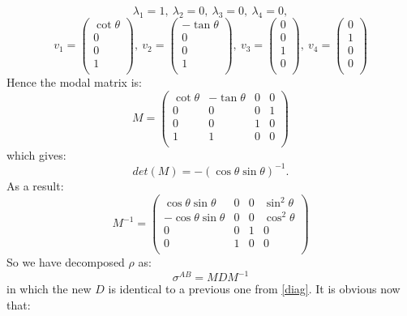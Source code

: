 \begin{itemize}
\begin{equation}
\lambda_1=1,\:  \lambda_2=0,\:  \lambda_3=0,\:  \lambda_4=0, 
\end{equation}
\begin{equation}
v_1=\left(
\begin{array}{c}
 \cot \theta \\
 0\\
 0\\
 1 \\
\end{array}
\right),
\:  v_2=\left(
\begin{array}{c}
 -\tan \theta \\
 0\\
 0\\
 1 \\
\end{array}
\right),
\:  v_3= \left(
\begin{array}{c}
 0 \\
 0\\
 1\\
 0 \\
\end{array}
\right),\:  v_4= 
\left(
\begin{array}{c}
 0 \\
 1\\
 0\\
 0 \\
\end{array}
\right)
\end{equation}
Hence the modal matrix is:
\begin{equation}
M=\left(
\begin{array}{cccc}
 \cot \theta  & -\tan \theta  & 0 & 0 \\
 0 & 0 & 0 & 1 \\
 0 & 0 & 1 & 0 \\
 1 & 1 & 0 & 0 \\
\end{array}
\right)
\end{equation}
which gives:
\begin{equation}
det(M)=-(\cos \theta \sin \theta )^{-1}.
\end{equation}
As a result:
\begin{equation}
M^{-1}=
\left(
\begin{array}{cccc}
  \cos  \theta  \sin \theta  & 0 & 0 &  \sin ^2 \theta  \\
 - \cos   \theta  \sin  \theta  & 0 & 0 & \cos ^2 \theta  \\
 0 & 0 & 1 & 0 \\
 0 & 1 & 0 & 0 \\
\end{array}
\right)
\end{equation}
So we have decomposed $\rho$ as:
\begin{equation}
\sigma^{AB}=MDM^{-1}
\end{equation}
in which the new $D$ is identical to a previous one from \ref{diag}.
It is obvious now that:


\end{itemize}
